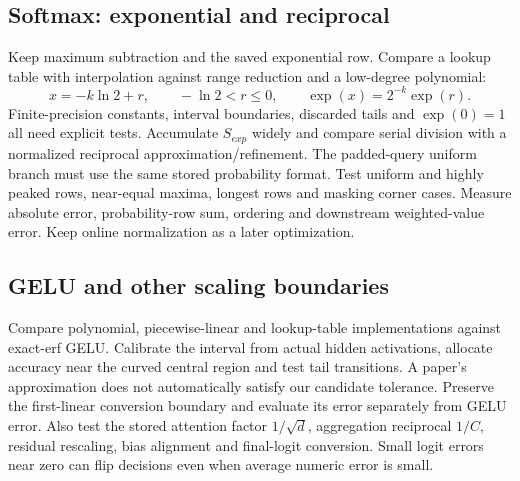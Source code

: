 \documentclass[11pt,a4paper]{article}
\begin{document}
\subsection{Softmax: exponential and reciprocal}
Keep maximum subtraction and the saved exponential row. Compare a lookup table with interpolation against range reduction and a low-degree polynomial:
\[
x=-k\ln 2+r,\qquad -\ln 2<r\leq0,\qquad \exp(x)=2^{-k}\exp(r).
\]
Finite-precision constants, interval boundaries, discarded tails and $\exp(0)=1$ all need explicit tests. Accumulate $S_{exp}$ widely and compare serial division with a normalized reciprocal approximation/refinement. The padded-query uniform branch must use the same stored probability format. Test uniform and highly peaked rows, near-equal maxima, longest rows and masking corner cases. Measure absolute error, probability-row sum, ordering and downstream weighted-value error. Keep online normalization as a later optimization.

\subsection{GELU and other scaling boundaries}
Compare polynomial, piecewise-linear and lookup-table implementations against exact-erf GELU. Calibrate the interval from actual hidden activations, allocate accuracy near the curved central region and test tail transitions. A paper's approximation does not automatically satisfy our candidate tolerance. Preserve the first-linear conversion boundary and evaluate its error separately from GELU error.
Also test the stored attention factor $1/\sqrt d$, aggregation reciprocal $1/C$, residual rescaling, bias alignment and final-logit conversion. Small logit errors near zero can flip decisions even when average numeric error is small.
\end{document}
